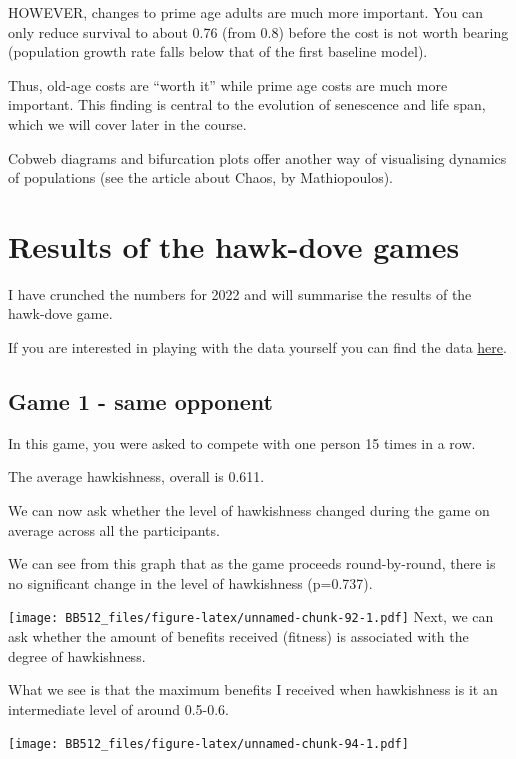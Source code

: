 \documentclass[
  a4paper]{book}
\begin{document}
HOWEVER, changes to prime age adults are much more important. You can only reduce survival to about 0.76 (from 0.8) before the cost is not worth bearing (population growth rate falls below that of the first baseline model).

Thus, old-age costs are ``worth it'' while prime age costs are much more important. This finding is central to the evolution of senescence and life span, which we will cover later in the course.

Cobweb diagrams and bifurcation plots offer another way of visualising dynamics of populations (see the article about Chaos, by Mathiopoulos).

\hypertarget{results-of-the-hawk-dove-games}{%
\section{Results of the hawk-dove games}\label{results-of-the-hawk-dove-games}}

I have crunched the numbers for 2022 and will summarise the results of the hawk-dove game.

If you are interested in playing with the data yourself you can find the data \href{https://www.dropbox.com/s/7ompsbe4iwirqar/gametheoryResults.xlsx?dl=0}{here}.

\hypertarget{game-1---same-opponent}{%
\subsection{Game 1 - same opponent}\label{game-1---same-opponent}}

In this game, you were asked to compete with one person 15 times in a row.

The average hawkishness, overall is 0.611.

We can now ask whether the level of hawkishness changed during the game on average across all the participants.

We can see from this graph that as the game proceeds round-by-round, there is no significant change in the level of hawkishness (p=0.737).

\texttt{[image: BB512\_files/figure-latex/unnamed-chunk-92-1.pdf]}
Next, we can ask whether the amount of benefits received (fitness) is associated with the degree of hawkishness.

What we see is that the maximum benefits I received when hawkishness is it an intermediate level of around 0.5-0.6.

\texttt{[image: BB512\_files/figure-latex/unnamed-chunk-94-1.pdf]}
\end{document}
